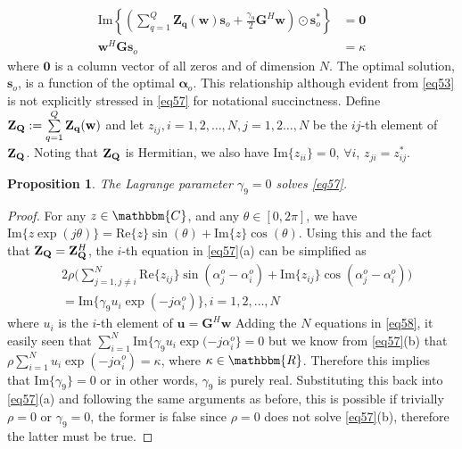 \documentclass[11pt,draftclsnofoot,onecolumn]{IEEEtran}
\newtheorem{prop}{\bf{Proposition}}
\theoremstyle{definition}
\theoremstyle{remark}
\begin{document}
\begin{subequations}\label{eq57}
\begin{align} 
\mbox{Im}\left\{ \left(\sum\limits_{q=1}^Q\mathbf{Z_q}(\mathbf{w}) \mathbf{s}_o+\frac{\gamma_9}{2} \mathbf{G}^H \mathbf{w} \right)\odot \mathbf{s}_o^* \right\}&=\mathbf{0} \\
\mathbf{w}^H\mathbf{G}\mathbf{s}_o&=\kappa
\end{align}
\end{subequations}
where $\mathbf{0}$ is a column vector of all zeros and of dimension $N$. The optimal solution, $\mathbf{s}_o$, is a  function of the optimal $\boldsymbol{\alpha}_o$. This relationship although evident from \eqref{eq53} is not explicitly stressed in \eqref{eq57} for notational succinctness. Define $\mathbf{Z}_{\bf Q}:=\sum\limits_{q=1}^Q\mathbf{Z_q}(\mathbf{w})$ and let $z_{ij},i=1,2,\ldots,N,j=1,2\ldots,N$ be the $ij$-th element of $\mathbf{Z}_{\bf Q}$. Noting that $\mathbf{Z}_{\bf Q}$ is Hermitian, we also have $\mbox{Im}\{z_{ii}\}=0,\,\forall i$, $z_{ji}=z_{ij}^{\ast}$.

\begin{prop}\label{propos6}
The Lagrange parameter $\gamma_9=0$ solves \eqref{eq57}.
\end{prop}
\begin{proof}
For any $z\in\mathbbm{C}$, and any $\theta\in [0,2\pi]$, we have $\mbox{Im}\{ z\exp(j\theta)\}=\mbox{Re}\{z\}\sin(\theta)+\mbox{Im}\{z\}\cos(\theta)$. Using this and the fact that $\mathbf{Z}_{\bf Q}=\mathbf{Z}_{\bf Q}^H$, the $i$-th equation in \eqref{eq57}(a) can be simplified as
\begin{equation}\label{eq58}
\begin{aligned}
&2\rho
\big( \sum\limits_{j=1, j\neq i}^{N} \mbox{Re}\{ z_{ij}\}\sin(\alpha_{j}^o-\alpha_{i}^o )+\mbox{Im}\{z_{ij} \} \cos( \alpha_{j}^o-\alpha_{i}^o )\big)\\
&=\mbox{Im}\{ \gamma_9u_i\exp(-j\alpha_{i}^o)\}, i=1,2,\ldots,N
\end{aligned}
\end{equation}
where $u_i$ is the $i$-th element of $\mathbf{u}=\mathbf{G}^H\mathbf{w}$  Adding the $N$ equations in \eqref{eq58}, it easily seen that $\sum \limits_{i=1}^N\mbox{Im}\{ \gamma_9u_i\exp(-j\alpha_i^o\}=0$ but we know from \eqref{eq57}(b) that $\rho\sum \limits_{i=1}^N u_i\exp(-j\alpha_i^o)=\kappa$, where $\kappa\in\mathbbm{R}$. Therefore this implies that $\mbox{Im}\{\gamma_9\}=0$ or in other words, $\gamma_9 $ is purely real. Substituting this back into \eqref{eq57}(a) and following the same arguments as before, this is possible if trivially $\rho=0$ or $\gamma_9=0$, the former is false since $\rho=0$ does not solve \eqref{eq57}(b), therefore the latter must be true.
\end{proof}
\end{document}
